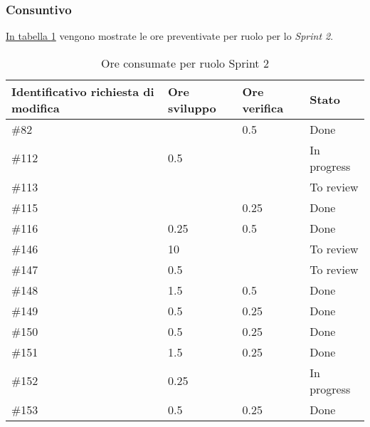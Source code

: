 \subsubsection{Consuntivo}

\hyperref[tab:sprint2_ore_consumate]{In tabella \ref{tab:sprint2_ore_consumate}} vengono mostrate le ore preventivate per ruolo per lo \textit{Sprint 2}.

\begin{table}[H]
    \centering
        \begin{tabular}{| l | l | l | l |}
            \hline
                \textbf{Identificativo richiesta di modifica} & 
                \textbf{Ore sviluppo} &
                \textbf{Ore verifica} & 
                \textbf{Stato}\\ 
    \hline
        \#82 &  & 0.5 & Done \\
    \hline
        \#112 & 0.5 &  & In progress \\
    \hline
        \#113 &  &  & To review \\
    \hline
        \#115 &  & 0.25 & Done \\
    \hline
        \#116 & 0.25 & 0.5 & Done \\
    \hline
        \#146 & 10 &  & To review \\
    \hline
        \#147 & 0.5 & & To review \\
    \hline
        \#148 & 1.5 & 0.5 & Done \\
    \hline
        \#149 & 0.5 & 0.25 & Done \\
    \hline
        \#150 & 0.5 & 0.25 & Done \\
     \hline
        \#151 & 1.5 & 0.25 & Done \\
    \hline
        \#152 & 0.25 &  & In progress \\
    \hline
        \#153 & 0.5 & 0.25 & Done \\
    \hline
    \end{tabular}
    \caption{Ore consumate per ruolo Sprint 2}
    \label{tab:sprint2_ore_consumate} 
\end{table}